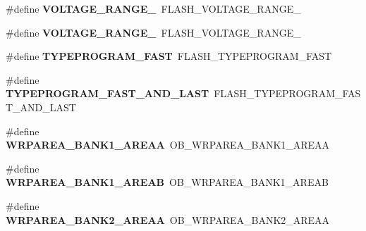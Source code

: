 \begin{DoxyCompactItemize}
\item 
\mbox{\label{group___h_a_l___f_l_a_s_h___aliased___defines_ga45c6cc06a75f9dfd18e3d182cbe1387b}} 
\#define {\bfseries V\+O\+L\+T\+A\+G\+E\+\_\+\+R\+A\+N\+G\+E\+\_}~F\+L\+A\+S\+H\+\_\+\+V\+O\+L\+T\+A\+G\+E\+\_\+\+R\+A\+N\+G\+E\+\_
\item 
\mbox{\label{group___h_a_l___f_l_a_s_h___aliased___defines_ga98497e19f090f03d71a1537fbcfebfe9}} 
\#define {\bfseries V\+O\+L\+T\+A\+G\+E\+\_\+\+R\+A\+N\+G\+E\+\_}~F\+L\+A\+S\+H\+\_\+\+V\+O\+L\+T\+A\+G\+E\+\_\+\+R\+A\+N\+G\+E\+\_
\item 
\mbox{\label{group___h_a_l___f_l_a_s_h___aliased___defines_gae3b03b62939464528d8a52b034135ea2}} 
\#define {\bfseries T\+Y\+P\+E\+P\+R\+O\+G\+R\+A\+M\+\_\+\+F\+A\+ST}~F\+L\+A\+S\+H\+\_\+\+T\+Y\+P\+E\+P\+R\+O\+G\+R\+A\+M\+\_\+\+F\+A\+ST
\item 
\mbox{\label{group___h_a_l___f_l_a_s_h___aliased___defines_gab52dbb436e471071f4700f9bafcb0cef}} 
\#define {\bfseries T\+Y\+P\+E\+P\+R\+O\+G\+R\+A\+M\+\_\+\+F\+A\+S\+T\+\_\+\+A\+N\+D\+\_\+\+L\+A\+ST}~F\+L\+A\+S\+H\+\_\+\+T\+Y\+P\+E\+P\+R\+O\+G\+R\+A\+M\+\_\+\+F\+A\+S\+T\+\_\+\+A\+N\+D\+\_\+\+L\+A\+ST
\item 
\mbox{\label{group___h_a_l___f_l_a_s_h___aliased___defines_ga4d57e7a32711f223077cc45a55b4d333}} 
\#define {\bfseries W\+R\+P\+A\+R\+E\+A\+\_\+\+B\+A\+N\+K1\+\_\+\+A\+R\+E\+AA}~O\+B\+\_\+\+W\+R\+P\+A\+R\+E\+A\+\_\+\+B\+A\+N\+K1\+\_\+\+A\+R\+E\+AA
\item 
\mbox{\label{group___h_a_l___f_l_a_s_h___aliased___defines_ga073be154a6602831a813316fa4fb17ca}} 
\#define {\bfseries W\+R\+P\+A\+R\+E\+A\+\_\+\+B\+A\+N\+K1\+\_\+\+A\+R\+E\+AB}~O\+B\+\_\+\+W\+R\+P\+A\+R\+E\+A\+\_\+\+B\+A\+N\+K1\+\_\+\+A\+R\+E\+AB
\item 
\mbox{\label{group___h_a_l___f_l_a_s_h___aliased___defines_ga385f3bbec731cc31de0a8f83943f678c}} 
\#define {\bfseries W\+R\+P\+A\+R\+E\+A\+\_\+\+B\+A\+N\+K2\+\_\+\+A\+R\+E\+AA}~O\+B\+\_\+\+W\+R\+P\+A\+R\+E\+A\+\_\+\+B\+A\+N\+K2\+\_\+\+A\+R\+E\+AA

\end{DoxyCompactItemize}
